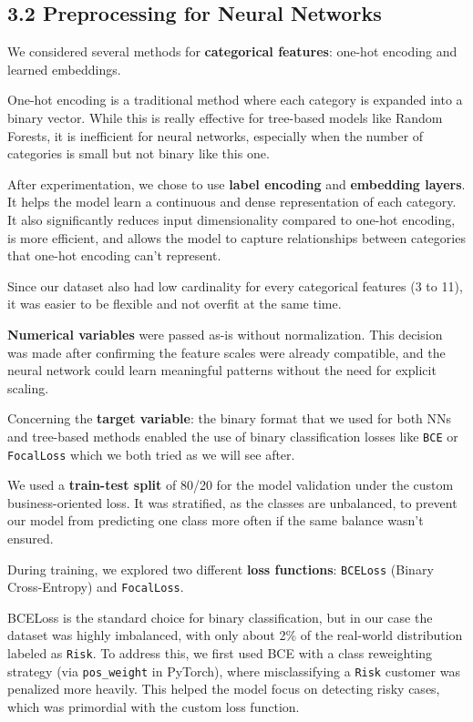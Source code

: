 \documentclass[12pt]{report}
\begin{document}
\subsection*{3.2 Preprocessing for Neural Networks}

We considered several methods for \textbf{categorical features}: one-hot encoding and learned embeddings.

One-hot encoding is a traditional method where each category is expanded into a binary vector. While this is really effective for tree-based models like Random Forests, it is inefficient for neural networks, especially when the number of categories is small but not binary like this one.

After experimentation, we chose to use \textbf{label encoding} and \textbf{embedding layers}. It helps the model learn a continuous and dense representation of each category. It also significantly reduces input dimensionality compared to one-hot encoding, is more efficient, and allows the model to capture relationships between categories that one-hot encoding can't represent.

Since our dataset also had low cardinality for every categorical features (3 to 11), it was easier to be flexible and not overfit at the same time.

\textbf{Numerical variables} were passed as-is without normalization. This decision was made after confirming the feature scales were already compatible, and the neural network could learn meaningful patterns without the need for explicit scaling.

Concerning the \textbf{target variable}: the binary format that we used for both NNs and tree-based methods enabled the use of binary classification losses like \texttt{BCE} or \texttt{FocalLoss} which we both tried as we will see after.

We used a \textbf{train-test split} of 80/20 for the model validation under the custom business-oriented loss.
It was stratified, as the classes are unbalanced, to prevent our model from predicting one class more often if the same balance wasn't ensured.

During training, we explored two different \textbf{loss functions}: \texttt{BCELoss} (Binary Cross-Entropy) and \texttt{FocalLoss}. 

BCELoss is the standard choice for binary classification, but in our case the dataset was highly imbalanced, with only about 2\% of the real-world distribution labeled as \texttt{Risk}. To address this, we first used BCE with a class reweighting strategy (via \texttt{pos\_weight} in PyTorch), where misclassifying a \texttt{Risk} customer was penalized more heavily. This helped the model focus on detecting risky cases, which was primordial with the custom loss function.
\end{document}

